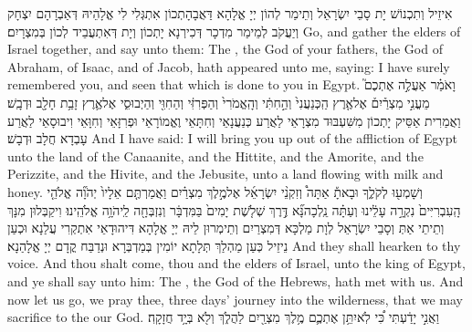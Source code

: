 {אִיזֵיל וְתִכְנוֹשׁ יָת סָבֵי יִשְׂרָאֵל וְתֵימַר לְהוֹן יְיָ אֱלָהָא דַּאֲבָהָתְכוֹן אִתְגְּלִי לִי אֱלָהֵיהּ דְּאַבְרָהָם יִצְחָק וְיַעֲקֹב לְמֵימַר מִדְכָר דְּכִירְנָא יָתְכוֹן וְיָת דְּאִתְעֲבֵיד לְכוֹן בְּמִצְרָיִם׃}
{Go, and gather the elders of Israel together, and say unto them: The \lord, the God of your fathers, the God of Abraham, of Isaac, and of Jacob, hath appeared unto me, saying: I have surely remembered you, and seen that which is done to you in Egypt.}{}
{וָאֹמַ֗ר אַעֲלֶ֣ה אֶתְכֶם֮ מֵעֳנִ֣י מִצְרַ֒יִם֒ אֶל\maqqaf אֶ֤רֶץ הַֽכְּנַעֲנִי֙ וְהַ֣חִתִּ֔י וְהָֽאֱמֹרִי֙ וְהַפְּרִזִּ֔י וְהַחִוִּ֖י וְהַיְבוּסִ֑י אֶל\maqqaf אֶ֛רֶץ זָבַ֥ת חָלָ֖ב וּדְבָֽשׁ׃}
{וַאֲמַרִית אַסֵּיק יָתְכוֹן מִשִּׁעְבּוּד מִצְרָאֵי לַאֲרַע כְּנַעֲנָאֵי וְחִתָּאֵי וֶאֱמוֹרָאֵי וּפְרִזָּאֵי וְחִוָּאֵי וִיבוּסָאֵי לַאֲרַע עָבְדָא חֲלָב וּדְבָשׁ׃}
{And I have said: I will bring you up out of the affliction of Egypt unto the land of the Canaanite, and the Hittite, and the Amorite, and the Perizzite, and the Hivite, and the Jebusite, unto a land flowing with milk and honey.}{}
{וְשָׁמְע֖וּ לְקֹלֶ֑ךָ וּבָאתָ֡ אַתָּה֩ וְזִקְנֵ֨י יִשְׂרָאֵ֜ל אֶל\maqqaf מֶ֣לֶךְ מִצְרַ֗יִם וַאֲמַרְתֶּ֤ם אֵלָיו֙ יְהֹוָ֞ה אֱלֹהֵ֤י הָֽעִבְרִיִּים֙ נִקְרָ֣ה עָלֵ֔ינוּ וְעַתָּ֗ה נֵֽלְכָה\maqqaf נָּ֞א דֶּ֣רֶךְ שְׁלֹ֤שֶׁת יָמִים֙ בַּמִּדְבָּ֔ר וְנִזְבְּחָ֖ה לַֽיהֹוָ֥ה אֱלֹהֵֽינוּ׃}
{וִיקַבְּלוּן מִנָּךְ וְתֵיתֵי אַתְּ וְסָבֵי יִשְׂרָאֵל לְוָת מַלְכָּא דְּמִצְרַיִם וְתֵימְרוּן לֵיהּ יְיָ אֱלָהָא דִּיהוּדָאֵי אִתְקְרִי עֲלַנָא וּכְעַן נֵיזֵיל כְּעַן מַהְלַךְ תְּלָתָא יוֹמִין בְּמַדְבְּרָא וּנְדַבַּח קֳדָם יְיָ אֱלָהַנָא׃}
{And they shall hearken to thy voice. And thou shalt come, thou and the elders of Israel, unto the king of Egypt, and ye shall say unto him: The \lord, the God of the Hebrews, hath met with us. And now let us go, we pray thee, three days’ journey into the wilderness, that we may sacrifice to the \lord\space our God.}{}
{וַאֲנִ֣י יָדַ֔עְתִּי כִּ֠י לֹֽא\maqqaf יִתֵּ֥ן אֶתְכֶ֛ם מֶ֥לֶךְ מִצְרַ֖יִם לַהֲלֹ֑ךְ וְלֹ֖א בְּיָ֥ד חֲזָקָֽה׃}
